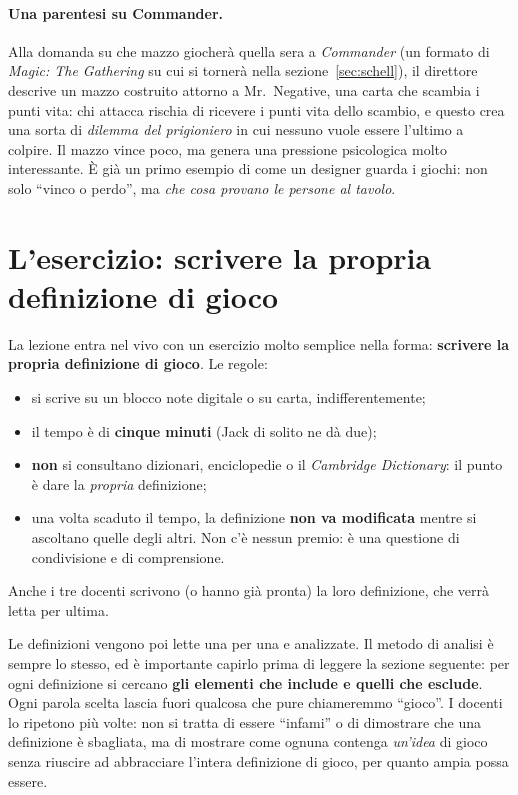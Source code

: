 \paragraph{Una parentesi su Commander.} Alla domanda su che mazzo giocherà
quella sera a \emph{Commander} (un formato di \emph{Magic: The Gathering} su
cui si tornerà nella sezione~\ref{sec:schell}), il direttore descrive un mazzo
costruito attorno a Mr.\ Negative, una carta che scambia i punti vita: chi
attacca rischia di ricevere i punti vita dello scambio, e questo crea una sorta
di \emph{dilemma del prigioniero} in cui nessuno vuole essere l'ultimo a
colpire. Il mazzo vince poco, ma genera una pressione psicologica molto
interessante. È già un primo esempio di come un designer guarda i giochi:
non solo ``vinco o perdo'', ma \emph{che cosa provano le persone al tavolo}.

\section{L'esercizio: scrivere la propria definizione di gioco}
\label{sec:esercizio-definizione}

La lezione entra nel vivo con un esercizio molto semplice nella forma:
\textbf{scrivere la propria definizione di gioco}. Le regole:
\begin{itemize}
  \item si scrive su un blocco note digitale o su carta, indifferentemente;
  \item il tempo è di \textbf{cinque minuti} (Jack di solito ne dà due);
  \item \textbf{non} si consultano dizionari, enciclopedie o il \emph{Cambridge
        Dictionary}: il punto è dare la \emph{propria} definizione;
  \item una volta scaduto il tempo, la definizione \textbf{non va
        modificata} mentre si ascoltano quelle degli altri. Non c'è nessun
        premio: è una questione di condivisione e di comprensione.
\end{itemize}
Anche i tre docenti scrivono (o hanno già pronta) la loro definizione, che
verrà letta per ultima.

Le definizioni vengono poi lette una per una e analizzate. Il metodo di
analisi è sempre lo stesso, ed è importante capirlo prima di leggere la
sezione seguente: per ogni definizione si cercano \textbf{gli elementi che
include e quelli che esclude}. Ogni parola scelta lascia fuori qualcosa che
pure chiameremmo ``gioco''. I docenti lo ripetono più volte: non si tratta di
essere ``infami'' o di dimostrare che una definizione è sbagliata, ma di
mostrare come ognuna contenga \emph{un'idea} di gioco senza riuscire ad
abbracciare l'intera definizione di gioco, per quanto ampia possa essere.

